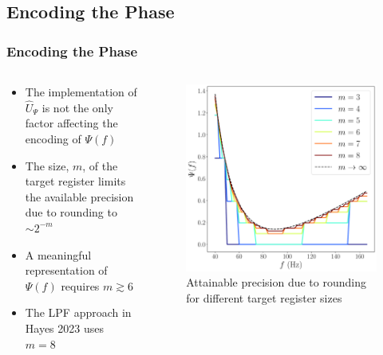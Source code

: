 \documentclass{beamer}
\begin{document}
\begin{frame}
\subsection{Encoding the Phase}
\frametitle{Encoding the Phase}
\begin{columns}
\begin{column}{0.5\textwidth}
\begin{itemize}
\item The implementation of $\hat{U}_\Psi$ is not the only factor affecting the encoding of $\Psi(f)$
\item The size, $m$, of the target register limits the available precision due to rounding to $\sim 2^{-m}$ 
\item A meaningful representation of $\Psi(f)$  requires $m \gtrsim 6$
\item The LPF approach in Hayes 2023 uses $m=8$
\end{itemize}
\end{column}
\begin{column}{0.5\textwidth}  
\begin{figure}[h]
\centering
\includegraphics[width=\textwidth]{im/phase_round_comp}
\caption{Attainable precision due to rounding for different target register sizes}
\end{figure}
\end{column}
\end{columns}
\end{frame}
\end{document}
